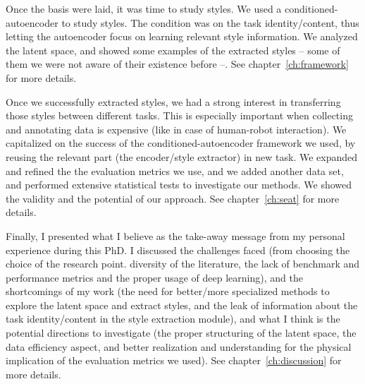   \par Once the basis were laid, it was time to study styles. We used a conditioned-autoencoder to study styles. The condition was on the task identity/content, thus letting the autoencoder focus on learning relevant style information. We analyzed the latent space, and showed some examples of the extracted styles -- some of them we were not aware of their existence before --. See chapter~\ref{ch:framework} for more details.

  \par Once we successfully extracted styles, we had a strong interest in transferring those styles between different tasks. This is especially important when collecting and annotating data is expensive (like in case of human-robot interaction). We capitalized on the success of the conditioned-autoencoder framework we used, by reusing the relevant part (the encoder/style extractor) in new task. We expanded and refined the the evaluation metrics we use, and we added another data set, and performed extensive statistical tests to investigate our methods. We showed the validity and the potential of our approach. See chapter~\ref{ch:seat} for more details.

  \par Finally, I presented what I believe as the take-away message from my personal experience during this PhD. I discussed the challenges faced (from choosing the choice of the research point. diversity of the literature, the lack of benchmark and performance metrics and the proper usage of deep learning), and the shortcomings of my work (the need for better/more specialized methods to explore the latent space and extract styles, and the leak of information about the task identity/content in the style extraction module), and what I think is the potential directions to investigate (the proper structuring of the latent space, the data efficiency aspect, and better realization and understanding for the physical implication of the evaluation metrics we used). See chapter~\ref{ch:discussion} for more details.


